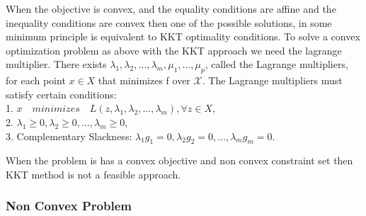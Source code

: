 \documentclass[a4paper, 12pt,titlepage]{dithesis} %
\newcommand{\me}[1]{\( #1 \)}
\begin{document}
\par
When the objective is convex, and the equality conditions are affine and the inequality conditions are convex then one of the possible solutions, in some minimum principle is equivalent to \ac{KKT} optimality conditions. To solve a convex optimization problem as above with the \ac{KKT} approach we need the lagrange multiplier. There exists \me{\lambda_1, \lambda_2, \dotsc, \lambda_m, \mu_1, \dotsc, \mu_p}, called the Lagrange multipliers, for each point \me{x \in X} that minimizes f over \me{\mathcal{X}}. The Lagrange multipliers must satisfy certain conditions:\\
 1. \me{{x} \quad minimizes \quad L(z, \lambda_1, \lambda_2, \dotsc, \lambda_m),   \forall z \in X},\\
 2. \me{\lambda_1 \geq 0, \lambda_2 \geq 0, \dotsc, \lambda_m \geq 0},\\
 3. Complementary Slackness: \me{\lambda_1 g_1 = 0, \lambda_2 g_2 = 0, \dotsc, \lambda_m g_m = 0}.\\
\par 
When the problem is has a convex objective and non convex constraint set then \ac{KKT} method is not a feasible approach. 


\subsubsection{Non Convex Problem}
 
\end{document}
